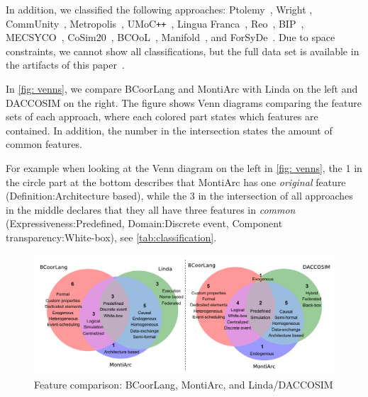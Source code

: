 \documentclass[runningheads]{llncs}
\begin{document}
In addition, we classified the following approaches: Ptolemy~\cite{ekerTamingHeterogeneityPtolemy2003,ptolemaeusSystemDesignModeling2014}, Wright \cite{allenFormalBasisArchitectural1997,allenFormalApproachSoftware1997}, CommUnity~\cite{fiadeiroSemanticsArchitecturalConnectors1997,oliveiraCommUnityWorkbench2007}, Metropolis~\cite{balarinMetropolisIntegratedElectronic2003}, UMoC\texttt{++}~\cite{mathaikuttyUMoCBasedMultiMoC2006}, Lingua Franca~\cite{lohstrohReactorsDeterministicModel2020,lohstrohLinguaFrancaDeterministic2021}, Reo~\cite{arbabReoChannelbasedCoordination2004}, BIP~\cite{bliudzeAlgebraConnectorsStructuring2008,basuRigorousComponentBasedSystem2011},
MECSYCO~\cite{camusCosimulationCyberphysicalSystems2018,camusHybridCosimulationFMUs2016},
CoSim20~\cite{liboniComplexSystemsCosimulation2021},
BCOoL~\cite{varalarsenBehavioralCoordinationOperator2015,varalarsenBCOolBehavioralCoordination2016},
Manifold~\cite{arbabOverviewManifoldIts1993,papadopoulosModellingActivitiesInformation1998}, and ForSyDe~\cite{sanderSystemModelingTransformational2004,sanderForSyDeSystemDesign2016}.
Due to space constraints, we cannot show all classifications, but the full data set is available in the artifacts of this paper~\cite{timkrauterArtifactsCoordination2024}.

In \autoref{fig: venns}, we compare BCoorLang and MontiArc with Linda on the left and DACCOSIM on the right.
The figure shows Venn diagrams comparing the feature sets of each approach, where each colored part states which features are contained.
In addition, the number in the intersection states the amount of common features.

For example when looking at the Venn diagram on the left in \autoref{fig: venns}, the \textsf{1} in the circle part at the bottom describes that MontiArc has one \textit{original} feature (\textsf{Definition:Architecture based}), while the \textsf{3} in the intersection of all approaches in the middle declares that they all have three features in \textit{common} (\textsf{Expressiveness:Predefined, Domain:Discrete event, Component transparency:White-box}), see \autoref{tab:classification}.

\begin{figure}[ht]
	\centering
	\includegraphics[width=1\textwidth]{images/venns}
	\caption{Feature comparison: BCoorLang, MontiArc, and Linda/DACCOSIM}
	\label{fig: venns}
\end{figure}
\end{document}
